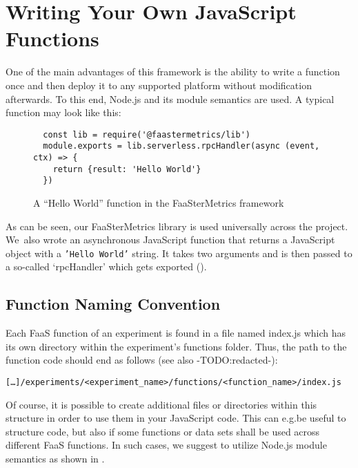 \documentclass[../main.tex]{subfiles}
\begin{document}
\section{Writing Your Own JavaScript Functions}\label{sec:jsFunctions}

One of the main advantages of this framework is the ability to write a function once 
and then deploy it to any supported platform without modification afterwards.
To this end, Node.js and its module semantics are used. A typical function may look like this:

\begin{figure}[H]
\begin{tcolorbox}
\begin{verbatim}
  const lib = require('@faastermetrics/lib')
  module.exports = lib.serverless.rpcHandler(async (event, ctx) => {
    return {result: 'Hello World'}
  })
\end{verbatim}
\end{tcolorbox}
\caption{A ``Hello World'' function in the FaaSterMetrics framework}%
\label{fig:fmHelloWorld}
\end{figure}

As can be seen, our FaaSterMetrics library is used universally across the project. 
We~also wrote an asynchronous JavaScript function that returns a JavaScript object with a \texttt{'Hello World'} string. 
It takes two arguments and is then passed to a so-called `rpcHandler' which gets exported (). 

\newpage{}%
\subsection{Function Naming Convention}

Each FaaS function of an experiment is found in a file named index.js which has its own directory within the experiment's functions folder.
Thus, the path to the function code should end as follows (see also -TODO:\@ redacted-):%
\begin{tcolorbox}
  \texttt{[\ldots]/experiments/<experiment\_name>/functions/<function\_name>/index.js}
\end{tcolorbox}

Of course, it is possible to create additional files or directories within this structure in order to use them in your JavaScript code.
This can e.g.\@ be useful to structure code, but also if some functions or data sets shall be used across different FaaS functions.
In such cases, we suggest to utilize Node.js module semantics as shown in .
\end{document}
